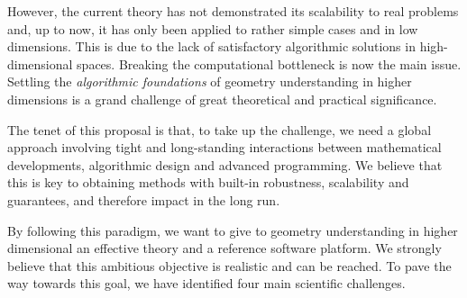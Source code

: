 


However, the current theory has not demonstrated its scalability to real problems and, up to now, it has only been applied to rather simple cases and in low dimensions.  
This is  due to the lack of satisfactory algorithmic solutions in high-dimensional spaces.
Breaking the computational bottleneck is now the main issue.  Settling the {\em algorithmic foundations} of geometry understanding in
higher dimensions
is a grand challenge of great theoretical and practical significance.


The tenet of this proposal is that, to take up the challenge, we need a global approach involving
tight and long-standing interactions between mathematical developments, algorithmic design and advanced programming. We believe that this is key to obtaining methods with built-in
robustness, scalability and guarantees, and therefore  impact in the long run.

By following this paradigm, we want  to give to  geometry understanding in higher dimensional an effective theory and a reference software platform. 
We strongly believe that this ambitious objective is realistic and can be reached. To pave the way towards this goal, we have identified  four main scientific challenges.



